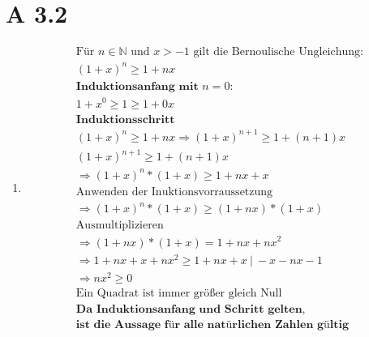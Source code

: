 \documentclass{article}
\begin{document}
    \section*{A 3.2}
        \begin{enumerate}[label = (\alph*)]
            \item 
                \begin{gather*}
                    \text{Für } n \in \mathbb{N} \text{ und } x > -1 \text{ gilt die Bernoulische Ungleichung:} \\
                    {(1+x)}^n \geq 1 + nx \\
                    \textbf{Induktionsanfang mit } n=0: \\
                    {1+x}^0 \geq 1 \geq 1 + 0x \\
                    \textbf{Induktionsschritt} \\
                    {(1+x)}^n \geq 1 + nx \Rightarrow {(1+x)}^{n+1} \geq 1 + (n+1)x \\
                    {(1+x)}^{n+1} \geq 1 + (n+1)x \\
                    \Rightarrow {(1+x)}^{n}*(1+x) \geq 1 + nx + x \\
                    \text{Anwenden der Inuktionsvorraussetzung} \\
                    \Rightarrow {(1+x)}^{n}*(1+x) \geq (1 + nx)*(1 + x) \\
                    \text{Ausmultiplizieren} \\
                    \Rightarrow (1 + nx)*(1 + x) = 1 + nx + nx^2 \\
                    \Rightarrow 1 + nx + x + nx^2 \geq 1 + nx + x  \: | \: -x - nx - 1\\
                    \Rightarrow nx^2 \geq 0 \\
                    \text{Ein Quadrat ist immer größer gleich Null} \\
                    \textbf{Da Induktionsanfang und Schritt gelten,} \\
                    \textbf{ist die Aussage für alle natürlichen Zahlen gültig}
                \end{gather*}


\end{enumerate}
\end{document}
